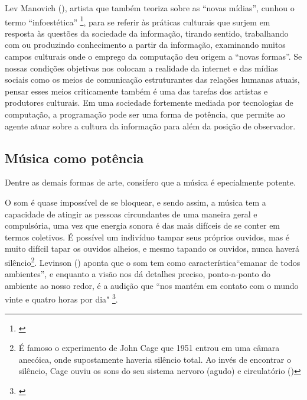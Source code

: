  Lev Manovich (\citeyear{Manovich2008}), artista que também teoriza sobre as ``novas mídias'', cunhou o termo ``infoestética'' \footnote{\cite{Manovich2008}}, para se referir às práticas culturais que surjem em resposta às questões da sociedade da informação, tirando sentido, trabalhando com ou produzindo conhecimento a partir da informação, examinando muitos campos culturais onde o emprego da computação deu origem a ``novas formas''. Se nossas condições objetivas nos colocam a realidade da internet e das mídias sociais como os meios de comunicação estruturantes das relações humanas atuais, pensar esses meios criticamente também é uma das tarefas dos artistas e produtores culturais. Em uma sociedade fortemente mediada por tecnologias de computação, a programação pode ser uma forma de potência, que permite ao agente atuar sobre a cultura da informação para além da posição de observador.

\subsection{Música como potência}
Dentre as demais formas de arte, consifero que a música é epecialmente potente. 


O som é quase impossível de se bloquear, e sendo assim, a música tem a capacidade de atingir as pessoas circundantes de uma maneira geral e compulsória, uma vez que energia sonora é das mais difíceis de se conter em termos coletivos. É possível um indivíduo tampar seus próprios ouvidos, mas é muito difícil tapar os ouvidos alheios, e mesmo tapando os ouvidos, nunca haverá silêncio\footnote{É famoso o experimento de John Cage que 1951 entrou em uma câmara anecóica, onde supostamente haveria silêncio total. Ao invés de encontrar o silêncio, Cage ouviu os sons do seu sistema nervoro (agudo) e circulatório (\cite{Mauceri1997})}. Levinson (\citeyear{Levinson2001}) aponta que o som tem como característica``emanar de todos ambientes'', e enquanto a visão nos dá detalhes preciso, ponto-a-ponto do ambiente ao nosso redor, é a audição que ``nos mantém em contato com o mundo vinte e quatro horas por dia" \footnote{\cite[47]{Levinson2001}}. 
 

